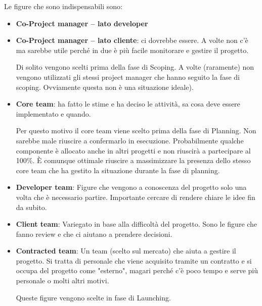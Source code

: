 Le figure che sono indispensabili sono:
\begin{itemize}
	\item \textbf{Co-Project manager – lato developer}
	\item \textbf{Co-Project manager – lato cliente}: ci dovrebbe essere. A volte non c'è ma sarebbe utile perché in due è più facile monitorare e gestire il progetto.
	\begin{info}
		Di solito vengono scelti prima della fase di Scoping. A volte (raramente) non vengono utilizzati gli stessi project manager che hanno seguito la fase di scoping. Ovviamente questa non è una situazione ideale).
	\end{info}
	\item \textbf{Core team}: ha fatto le stime e ha deciso le attività, sa cosa deve essere implementato e quando.
	\begin{info}
		Per questo motivo il core team viene scelto prima della fase di Planning. Non sarebbe male riuscire a confermarlo in esecuzione. Probabilmente qualche componente è allocato anche in altri progetti e non riuscirà a partecipare al 100\%. È comunque ottimale riuscire a massimizzare la presenza dello stesso core team che ha gestito la situazione durante la fase di planning.
	\end{info}
	\item \textbf{Developer team}: Figure che vengono a conoscenza del progetto solo una volta che è necessario partire. Importante cercare di rendere chiare le idee fin da subito.
	\item \textbf{Client team}: Variegato in base alla difficoltà del progetto. Sono le figure che fanno review e che ci aiutano a prendere decisioni.
	\item \textbf{Contracted team}: Un team (scelto sul mercato) che aiuta a gestire il progetto. Si tratta di personale che viene acquisito tramite un contratto e si occupa del progetto come "esterno", magari perché c'è poco tempo e serve più personale o molti altri motivi.
		\begin{info}
		Queste figure vengono scelte in fase di Launching.
	\end{info}
\end{itemize}

